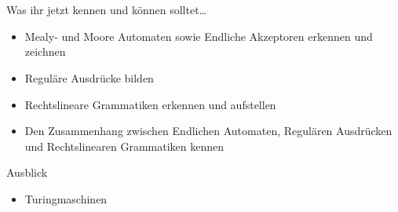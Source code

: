 

\section{}
	\begin{frame}{Was ihr jetzt kennen und können solltet\dots}
			\begin{itemize}
				\item Mealy- und Moore Automaten sowie Endliche Akzeptoren erkennen und zeichnen
				\item Reguläre Ausdrücke bilden
				\item Rechtslineare Grammatiken erkennen und aufstellen
				\item Den Zusammenhang zwischen Endlichen Automaten, Regulären Ausdrücken und Rechtslinearen Grammatiken kennen
			\end{itemize}
	\end{frame}
	\begin{frame}{Ausblick}
		\begin{itemize}
			\item Turingmaschinen
		\end{itemize}
	\end{frame}
\section{}
\questionframe
\lastframe
{}
